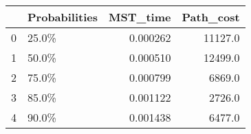 \begin{tabular}{llrr}
\toprule
{} & Probabilities &  MST\_time &  Path\_cost \\
\midrule
0 &         25.0\% &  0.000262 &    11127.0 \\
1 &         50.0\% &  0.000510 &    12499.0 \\
2 &         75.0\% &  0.000799 &     6869.0 \\
3 &         85.0\% &  0.001122 &     2726.0 \\
4 &         90.0\% &  0.001438 &     6477.0 \\
\bottomrule
\end{tabular}
